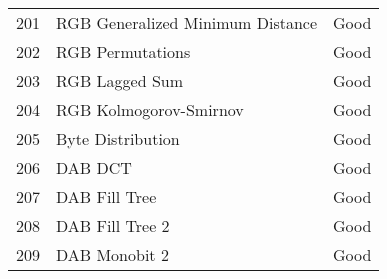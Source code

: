 \begin{table}[tb]
\begin{center}
\begin{tabular}{l | l | l}
201 &       RGB Generalized Minimum Distance  &        Good \\
202 &                       RGB Permutations  &        Good \\
203 &                         RGB Lagged Sum  &        Good \\
204 &            RGB Kolmogorov-Smirnov  &        Good \\
205 &                           Byte Distribution  &        Good \\
206 &                                     DAB DCT  &        Good \\
207 &                          DAB Fill Tree  &        Good \\
208 &                        DAB Fill Tree 2  &        Good \\
209 &                          DAB Monobit 2  &        Good \\
    \hline
    \hline
    \end{tabular}
  \end{center}
\end{table}





